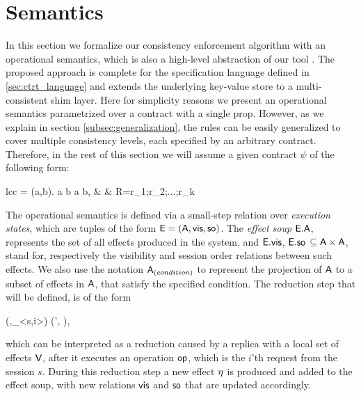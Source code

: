 \section{Semantics}
\label{sec:semantics}
In this section we formalize our consistency enforcement algorithm with an
operational semantics, which is also a high-level abstraction of our
tool \tool.
The proposed approach is complete for the specification language defined
in \ref{sec:ctrt_language}
and extends the underlying key-value store to a multi-consistent shim
layer. Here for simplicity reasons we present an operational semantics 
parametrized over a contract with a single prop. However, as we explain
in section \ref{subsec:generalization}, the rules can be easily
generalized to cover multiple consistency levels, each specified by an
arbitrary contract. Therefore, in the rest of this section we will assume a given contract $\psi$ of the
following form:
	\begin{smathpar}
	\begin{array}{lcc}
		\psi = \forall (a,b). a  b  \Rightarrow a
		\xrightarrow{\visZ} b, & \spc & R=r_1;r_2;...;r_k \\
	\end{array}
	\end{smathpar}

The operational semantics is defined via a small-step relation over \emph{execution
states}, which are tuples of the form ${\normalfont \textsf{E}}=({\normalfont \textsf{A}},{\normalfont \textsf{vis}} ,{\normalfont \textsf{so}})$.
The \emph{effect soup} ${\normalfont \textsf{E}}.{\normalfont \textsf{A}}$, represents the set of all
effects produced in the system, and  ${\normalfont \textsf{E}}.{\normalfont \textsf{vis}}$,
${\normalfont \textsf{E}}.{\normalfont \textsf{so}}$ $\subseteq {\normalfont \textsf{A}} \times {\normalfont \textsf{A}}$, stand for, respectively the
visibility and session order relations
between such effects. 
We also use the notation ${\normalfont \textsf{A}}_{(condition)}$
to represent the projection of ${\normalfont \textsf{A}}$ to a subset
of effects  in ${\normalfont \textsf{A}}$, that satisfy the specified condition.
The reduction step that will be defined, is of the form
\begin{smathpar}
(\E,\op_{<s,i>}) \;\xrightarrow{\V}\; (\E', \eff),
\end{smathpar}
which can be interpreted as a reduction caused by a replica with a local 
set of effects ${\normalfont \textsf{V}}$, after it executes an operation
${\normalfont \textsf{op}}$, which is the $i$'th request from the session $s$. 
During this reduction step a new effect $\eta$ is produced and added to
the effect soup, with new relations ${\normalfont \textsf{vis}}$ and ${\normalfont \textsf{so}}$ that are updated
accordingly.


